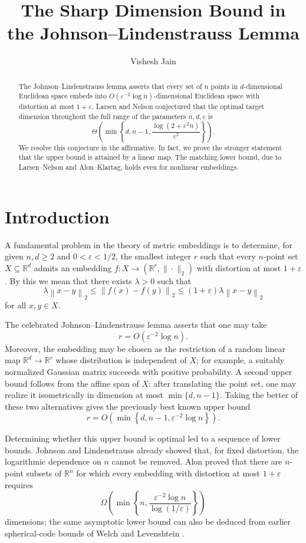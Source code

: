 \documentclass[11pt,reqno,letterpaper]{amsart}
\title[The sharp dimension bound in the JL lemma]
{The Sharp Dimension Bound in the Johnson--Lindenstrauss Lemma}
\author{Vishesh Jain}
\newcommand{\R}{\mathbb R}
\newcommand{\norm}[1]{\left\lVert #1\right\rVert_2}
\begin{document}
\begin{abstract}
The Johnson--Lindenstrauss lemma asserts that every set of $n$ points in $d$-dimensional Euclidean space embeds into $O(\varepsilon^{-2}\log n)$-dimensional Euclidean space with distortion at most $1+\varepsilon$. Larsen and Nelson conjectured that the optimal target dimension throughout the full range of the parameters $n,d, \varepsilon$ is 
\[
\Theta\left(\min\left\{d,n-1,\frac{\log(2+\varepsilon^2n)}{\varepsilon^2}\right\}\right).
\]
We resolve this conjecture in the affirmative. In fact, we prove the stronger statement that the upper bound is attained by a linear map. The matching lower bound, due to Larsen--Nelson and Alon--Klartag, holds even for nonlinear embeddings.
\end{abstract}


\maketitle

\section{Introduction}\label{sec:introduction}

A fundamental problem in the theory of metric embeddings is to determine,
for given $n,d\geq 2$ and $0<\varepsilon<1/2$, the smallest integer $r$
such that every $n$-point set $X\subseteq\R^d$ admits an embedding
$f:X\to(\R^r,\|\cdot\|_2)$ with distortion at most $1+\varepsilon$. By
this we mean that there exists $\lambda>0$ such that
\[
 \lambda\norm{x-y}
 \leq \norm{f(x)-f(y)}
 \leq (1+\varepsilon)\lambda\norm{x-y}
\]
for all $x,y\in X$.

The celebrated Johnson--Lindenstrauss lemma \cite{JL} asserts that one may
take
\[
 r=O(\varepsilon^{-2}\log n).
\]
Moreover, the embedding may be chosen as the restriction of a random linear map
$\R^d\to\R^r$ whose distribution is independent of $X$; for example, a suitably
normalized Gaussian matrix succeeds with positive probability. A second 
upper bound follows from the affine span of $X$: after translating the
point set, one may realize it isometrically in dimension at most
$\min\{d,n-1\}$. Taking the better of these two alternatives gives the
previously best known upper bound
\[
 r=O\left(
 \min\left\{
 d,n-1,\varepsilon^{-2}\log n
 \right\}
 \right).
\]

Determining whether this upper bound is optimal led to a sequence of lower
bounds. Johnson and Lindenstrauss already showed that, for fixed distortion,
the logarithmic dependence on $n$ cannot be removed. Alon \cite{Alon} proved that
there are $n$-point subsets of $\R^n$ for which every embedding with
distortion at most $1+\varepsilon$ requires
\[
 \Omega\left(
 \min\left\{
 n,\frac{\varepsilon^{-2}\log n}{\log(1/\varepsilon)}
 \right\}
 \right)
\]
dimensions; the same asymptotic lower bound can also be
deduced from earlier spherical-code bounds of Welch and Levenshtein
\cite{Welch,Levenshtein}. 
\end{document}
